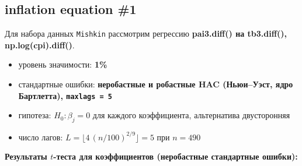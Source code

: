 \documentclass[
  russian,
]{article}
\providecommand{\tightlist}{%
  \setlength{\itemsep}{0pt}\setlength{\parskip}{0pt}}
\begin{document}
\subsection{inflation equation \#1}\label{inflation-equation-1-1}

Для набора данных \texttt{Mishkin} рассмотрим регрессию
\textbf{pai3.diff() на tb3.diff(), np.log(cpi).diff()}.

\begin{tcolorbox}[enhanced jigsaw, arc=.35mm, bottomrule=.15mm, bottomtitle=1mm, breakable, colback=white, colbacktitle=quarto-callout-important-color!10!white, colframe=quarto-callout-important-color-frame, coltitle=black, left=2mm, leftrule=.75mm, opacityback=0, opacitybacktitle=0.6, rightrule=.15mm, title=\textcolor{quarto-callout-important-color}{\faExclamation}\hspace{0.5em}{Условия теста}, titlerule=0mm, toprule=.15mm, toptitle=1mm]

\begin{itemize}
\tightlist
\item
  уровень значимости: \textbf{1\%}
\item
  стандартные ошибки: \textbf{неробастные и робастные HAC (Ньюи--Уэст,
  ядро Бартлетта), \texttt{maxlags\ =\ 5}}
\item
  гипотеза: \(H_0:\beta_j=0\) для каждого коэффициента, альтернатива
  двусторонняя
\item
  число лагов: \(L=\lfloor 4\,(n/100)^{2/9}\rfloor = 5\) при \(n=490\)
\end{itemize}

\end{tcolorbox}

\textbf{Результаты \(t\)-теста для коэффициентов (неробастные
стандартные ошибки):}
\end{document}
